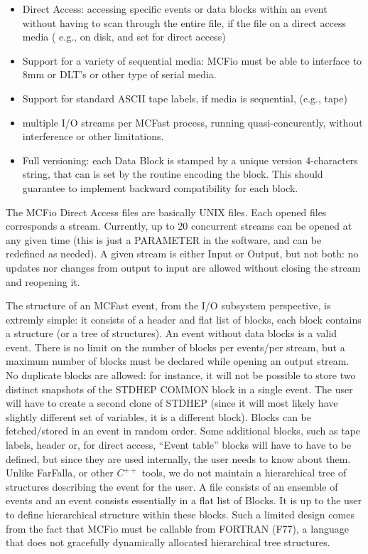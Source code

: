 \begin{itemize}
\item Direct Access:  accessing specific events or 
data blocks within an event without having to scan through the entire file,
if the file on a direct access media ( e.g., on disk, and set for direct
access) 
\item  Support for a variety of sequential media: MCFio must be able to 
interface to 8mm or DLT's or other type of serial media.
\item  Support for 
standard ASCII tape labels, if media is sequential, (e.g., tape)
\item  multiple I/O streams per MCFast process, running quasi-concurently, 
	without interference or other limitations. 
\item Full versioning: each Data 
Block is stamped by a unique version 4-characters string, that can is set
by the routine encoding the block. This should guarantee to implement 
backward compatibility for each block. 
\end{itemize}

The MCFio Direct Access files are basically UNIX files. Each opened 
files corresponds a stream. Currently, up to 20 concurrent 
streams can be opened at any given time (this is just a PARAMETER
in the software, and can be redefined as needed). A given stream is either 
Input or Output, but not both: no updates nor changes from output to 
input are allowed without closing the stream and reopening it. 

The structure of an MCFast event, from the I/O subsystem perspective, is
extremly simple: it consists of a header and flat list of blocks, each block
contains  a structure (or a tree of structures). An event without data blocks
is a valid event. There is no limit on the number of blocks per events/per
stream, but a maximum number of blocks must be declared while opening an output
stream.    No duplicate blocks are allowed:  for instance, it will not be
possible to store two distinct snapshots of the STDHEP COMMON block in a single
event. The user will have to  create a second clone of STDHEP (since it will
most likely have  slightly different set of variables, it is a different
block).  Blocks can be fetched/stored in an  event in random order. Some
additional blocks, such as tape labels, header or, for direct access, ``Event
table'' blocks will have to have to be defined, but since they are used
internally, the user needs to know about them.  
	Unlike FarFalla, or other $C^{++}$ tools, 
 we do not maintain a hierarchical tree of structures describing the event 
for the user. A file consists of an ensemble of events and an event
consists essentially in a flat list of Blocks. It is up to the user to 
define hierarchical structure within these blocks. Such a limited design 
comes from the fact that MCFio must be callable from FORTRAN (F77), a language
that does not gracefully dynamically allocated hierarchical tree 
structures.


